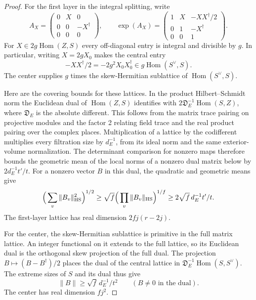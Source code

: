 \begin{proof}
For the first layer in the integral splitting, write
\[
 A_X=\begin{pmatrix}0&X&0\\0&0&-X^\dagger\\0&0&0\end{pmatrix},
 \qquad
 \exp(A_X)=
 \begin{pmatrix}1&X&-XX^\dagger/2\\
                 0&1&-X^\dagger\\0&0&1\end{pmatrix}.
\]
For \(X\in2g\operatorname{Hom}(Z,S)\) every off-diagonal
entry is integral and divisible by \(g\). In particular, writing
\(X=2gX_0\) makes the central entry
\[
 -XX^\dagger/2=-2g^2X_0X_0^\dagger
                   \in g\operatorname{Hom}(S^\vee,S).
\]
The center supplies \(g\) times the skew-Hermitian sublattice
of \(\operatorname{Hom}(S^\vee,S)\).


Here are the covering bounds for these lattices. In the
product Hilbert--Schmidt norm the Euclidean dual of
\(\operatorname{Hom}(Z,S)\) identifies with
\(2\mathfrak D_E^{-1}\operatorname{Hom}(S,Z)\), where
\(\mathfrak D_E\) is the absolute different. This follows
from the matrix trace pairing on projective modules and
the factor 2 relating field trace and the real product
pairing over the complex places. Multiplication of a
lattice by the codifferent multiplies every filtration
size by \(d_E^{-1}\), from its ideal norm and the same
exterior-volume normalization. The determinant comparison
for nonzero maps therefore bounds the geometric mean of
the local norms of a nonzero dual matrix below by
\(2d_E^{-1}t'/t\). For a nonzero vector \(B\) in this dual, the quadratic and
geometric means give
\[
 \Big(\sum_v\|B_v\|_{\rm HS}^2\Big)^{1/2}
 \ge\sqrt f\Big(\prod_v\|B_v\|_{\rm HS}\Big)^{1/f}
 \ge 2\sqrt f\,d_E^{-1}t'/t .
\] The first-layer lattice has
real dimension \(2fj(r-2j)\).

For the center, the skew-Hermitian sublattice is primitive
in the full matrix lattice. An integer functional on it
extends to the full lattice, so its Euclidean dual is the
orthogonal skew projection of the full dual. The projection \(B\mapsto (B-B^\dagger)/2\) places the dual of the
central lattice in \(\mathfrak D_E^{-1}\operatorname{Hom}(S,S^\vee)\).
The extreme sizes of \(S\) and its dual thus give
\[
                  \|B\|\ge \sqrt f\,d_E^{-1}/t^2
                         \qquad(B\ne0\text{ in the dual}).
\] The center has real dimension
\(fj^2\).


\end{proof}
